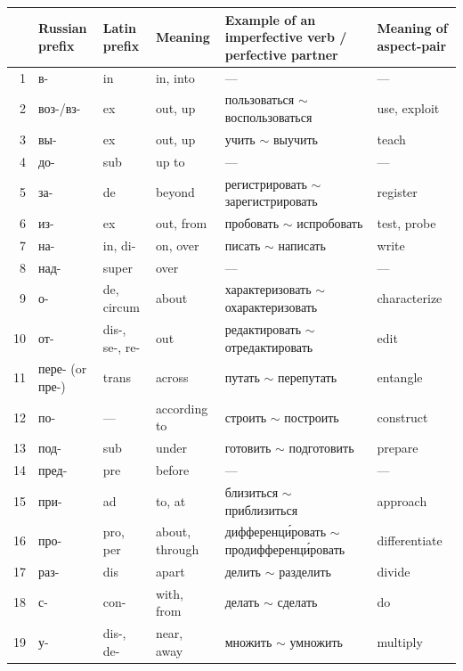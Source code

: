\begingroup
\footnotesize
\setlength{\tabcolsep}{2.5pt}
\renewcommand{\arraystretch}{1.08}
\begin{longtable}{@{}r >{\cyrillicfont}p{19mm} p{17mm} p{22mm} >{\cyrillicfont}p{32mm} p{29mm}@{}}
\toprule
& \normalfont Russian prefix & Latin prefix & Meaning & \normalfont Example of an imperfective verb / perfective partner & Meaning of aspect-pair\\
\midrule
\endhead
1 & в- & in & in, into & --- & ---\\
2 & воз-/вз- & ex & out, up & пользоваться $\sim$ воспользоваться & use, exploit\\
3 & вы- & ex & out, up & учить $\sim$ выучить & teach\\
4 & до- & sub & up to & --- & ---\\
5 & за- & de & beyond & регистрировать $\sim$ зарегистрировать & register\\
6 & из- & ex & out, from & пробовать $\sim$ испробовать & test, probe\\
7 & на- & in, di- & on, over & писать $\sim$ написать & write\\
8 & над- & super & over & --- & ---\\
9 & о- & de, circum & about & характеризовать $\sim$ охарактеризовать & characterize\\
10 & от- & dis-, se-, re- & out & редактировать $\sim$ отредактировать & edit\\
11 & пере- (or пре-) & trans & across & путать $\sim$ перепутать & entangle\\
12 & по- & --- & according to & строить $\sim$ построить & construct\\
13 & под- & sub & under & готовить $\sim$ подготовить & prepare\\
14 & пред- & pre & before & --- & ---\\
15 & при- & ad & to, at & близиться $\sim$ приблизиться & approach\\
16 & про- & pro, per & about, through & диф\-ференци́ровать $\sim$ про\-диф\-ференци́ровать & differentiate\\
17 & раз- & dis & apart & делить $\sim$ разделить & divide\\
18 & с- & con- & with, from & делать $\sim$ сделать & do\\
19 & у- & dis-, de- & near, away & множить $\sim$ умножить & multiply\\
\bottomrule
\end{longtable}
\endgroup


